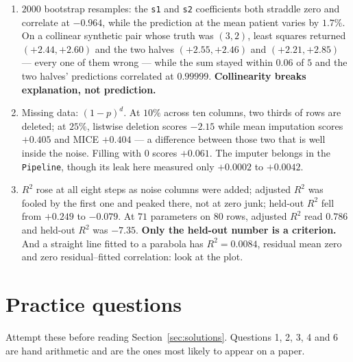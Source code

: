 \documentclass[11pt]{article}
\begin{document}
\begin{enumerate}[leftmargin=*]
    $\operatorname{Var}(\hat\beta_j)$. Four of the ten diabetes predictors
    exceed $10$; \texttt{s1} reaches $59.2$, so its standard error is
    $7.7\times$ inflated, and only $1.7\%$ of its variance is its own.
  \item $2000$ bootstrap resamples: the \texttt{s1} and \texttt{s2}
    coefficients both straddle zero and correlate at $-0.964$, while the
    prediction at the mean patient varies by $1.7\%$. On a collinear synthetic
    pair whose truth was $(3, 2)$, least squares returned $(+2.44, +2.60)$ and
    the two halves $(+2.55, +2.46)$ and $(+2.21, +2.85)$ --- every one of them
    wrong --- while the sum stayed within $0.06$ of $5$ and the two halves'
    predictions correlated at $0.99999$. \textbf{Collinearity breaks
    explanation, not prediction.}
  \item Missing data: $(1-p)^d$. At $10\%$ across ten columns, two thirds of
    rows are deleted; at $25\%$, listwise deletion scores $-2.15$ while mean
    imputation scores $+0.405$ and MICE $+0.404$ --- a difference between
    those two that is well inside the noise. Filling with $0$ scores
    $+0.061$. The imputer belongs in the \texttt{Pipeline}, though its leak
    here measured only $+0.0002$ to $+0.0042$.
  \item $R^2$ rose at all eight steps as noise columns were added; adjusted
    $R^2$ was fooled by the first one and peaked there, not at zero junk;
    held-out $R^2$ fell from $+0.249$ to $-0.079$. At $71$ parameters on $80$
    rows, adjusted $R^2$ read $0.786$ and held-out $R^2$ was $-7.35$.
    \textbf{Only the held-out number is a criterion.} And a straight line
    fitted to a parabola has $R^2 = 0.0084$, residual mean zero and zero
    residual--fitted correlation: look at the plot.
\end{enumerate}

\section{Practice questions}

Attempt these before reading Section~\ref{sec:solutions}. Questions 1, 2, 3, 4
and 6 are hand arithmetic and are the ones most likely to appear on a paper.
\end{document}
